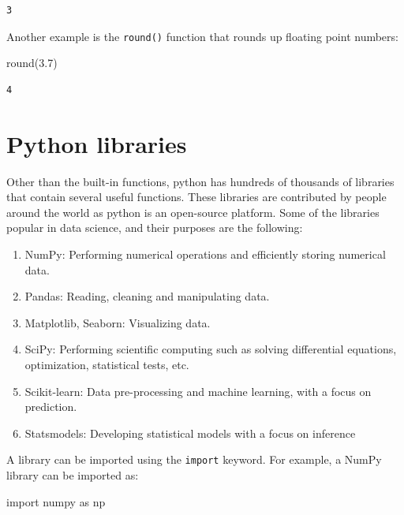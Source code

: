 \documentclass[
  letterpaper,
  DIV=11,
  numbers=noendperiod]{scrreprt}
\newenvironment{Shaded}{\begin{snugshade}}{\end{snugshade}}
\newcommand{\BuiltInTok}[1]{\textcolor[rgb]{0.00,0.23,0.31}{#1}}
\newcommand{\FloatTok}[1]{\textcolor[rgb]{0.68,0.00,0.00}{#1}}
\newcommand{\ImportTok}[1]{\textcolor[rgb]{0.00,0.46,0.62}{#1}}
\newcommand{\NormalTok}[1]{\textcolor[rgb]{0.00,0.23,0.31}{#1}}
\providecommand{\tightlist}{%
  \setlength{\itemsep}{0pt}\setlength{\parskip}{0pt}}\usepackage{longtable,booktabs,array}
\begin{document}
\begin{verbatim}
3
\end{verbatim}

Another example is the \texttt{round()} function that rounds up floating
point numbers:

\begin{Shaded}
\begin{Highlighting}[]
\BuiltInTok{round}\NormalTok{(}\FloatTok{3.7}\NormalTok{)}
\end{Highlighting}
\end{Shaded}

\begin{verbatim}
4
\end{verbatim}

\hypertarget{python-libraries-1}{%
\section{Python libraries}\label{python-libraries-1}}

Other than the built-in functions, python has hundreds of thousands of
libraries that contain several useful functions. These libraries are
contributed by people around the world as python is an open-source
platform. Some of the libraries popular in data science, and their
purposes are the following:

\begin{enumerate}
\def\labelenumi{\arabic{enumi}.}
\tightlist
\item
  NumPy: Performing numerical operations and efficiently storing
  numerical data.
\item
  Pandas: Reading, cleaning and manipulating data.
\item
  Matplotlib, Seaborn: Visualizing data.
\item
  SciPy: Performing scientific computing such as solving differential
  equations, optimization, statistical tests, etc.
\item
  Scikit-learn: Data pre-processing and machine learning, with a focus
  on prediction.
\item
  Statsmodels: Developing statistical models with a focus on inference
\end{enumerate}

A library can be imported using the \texttt{import} keyword. For
example, a NumPy library can be imported as:

\begin{Shaded}
\begin{Highlighting}[]
\ImportTok{import}\NormalTok{ numpy }\ImportTok{as}\NormalTok{ np}
\end{Highlighting}
\end{Shaded}
\end{document}
